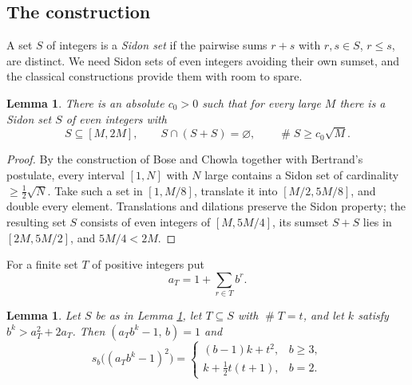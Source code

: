 \documentclass[11pt,reqno]{amsart}
\theoremstyle{plain}
\newtheorem{lemma}[theorem]{Lemma}
\theoremstyle{definition}
\DeclareMathOperator{\Card}{\#}
\begin{document}
\subsection{The construction}
A set $S$ of integers is a \emph{Sidon set} if the pairwise sums $r+s$ with $r,s\in S$, $r\le s$, are distinct. We need Sidon sets of even integers avoiding their own sumset, and the classical constructions provide them with room to spare.

\begin{lemma}\label{lem:sidon}
There is an absolute $c_0>0$ such that for every large $M$ there is a Sidon set $S$ of even integers with
\[
S\subseteq[M,2M],\qquad S\cap(S+S)=\varnothing,\qquad \Card S\ge c_0\sqrt M .
\]
\end{lemma}

\begin{proof}
By the construction of Bose and Chowla \cite{bosechowla} together with Bertrand's postulate, every interval $[1,N]$ with $N$ large contains a Sidon set of cardinality $\ge\tfrac12\sqrt N$. Take such a set in $[1,M/8]$, translate it into $[M/2,5M/8]$, and double every element. Translations and dilations preserve the Sidon property; the resulting set $S$ consists of even integers of $[M,5M/4]$, its sumset $S+S$ lies in $[2M,5M/2]$, and $5M/4<2M$.
\end{proof}

For a finite set $T$ of positive integers put
\begin{equation}\label{eq:aT}
a_T=1+\sum_{r\in T}b^{r}.
\end{equation}

\begin{lemma}\label{lem:carryfree}
Let $S$ be as in Lemma \ref{lem:sidon}, let $T\subseteq S$ with $\Card T=t$, and let $k$ satisfy $b^{k}>a_T^{2}+2a_T$. Then $(a_Tb^{k}-1,\,b)=1$ and
\[
s_b\big((a_Tb^{k}-1)^{2}\big)=
\begin{cases}
(b-1)k+t^{2},& b\ge3,\\[2pt]
k+\tfrac12t(t+1),& b=2 .
\end{cases}
\]
\end{lemma}
\end{document}
